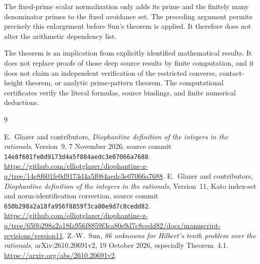 \documentclass[11pt,a4paper]{article}
\theoremstyle{remark}\newtheorem{remark}[theorem]{Remark}
\begin{document}
The fixed-prime scalar normalization only adds its prime and the finitely
many denominator primes to the fixed avoidance set. The preceding
argument permits precisely this enlargement before Sun's theorem is
applied. It therefore does not alter the arithmetic dependency list.

The theorem is an implication from explicitly identified mathematical
results. It does not replace proofs of those deep source results by
finite computation, and it does not claim an independent verification
of the restricted converse, contact-height theorem, or analytic
prime-pattern theorem. The computational certificates verify the
literal formulas, source bindings, and finite numerical deductions.

\begin{thebibliography}{9}\raggedright
{} E.~Glazer and contributors,
\emph{Diophantine definition of the integers in the rationals},
Version~9, 7 November 2026, source commit
\texttt{14e8f601fe0d9173d4a5f084aedc3e07066a7688}.
\url{https://github.com/elliotglazer/diophantine-z-q/tree/14e8f601fe0d9173d4a5f084aedc3e07066a7688}.
 E.~Glazer and contributors,
\emph{Diophantine definition of the integers in the rationals},
Version~11, Kato index-set and norm-identification correction,
source commit \texttt{650b298a2a18fa956f8859f3ca80e9d7c8cedd82}.
\url{https://github.com/elliotglazer/diophantine-z-q/tree/650b298a2a18fa956f8859f3ca80e9d7c8cedd82/docs/manuscript-revisions/version11}.
 Z.-W.~Sun,
\emph{86 unknowns for Hilbert's tenth problem over the rationals},
arXiv:2610.20691v2, 19 October 2026, especially Theorem~4.1.
\url{https://arxiv.org/abs/2610.20691v2}.
\end{thebibliography}
\end{document}
